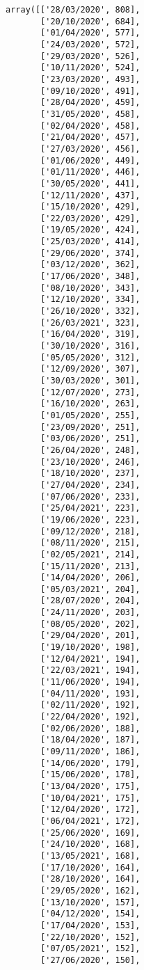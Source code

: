 \documentclass[11pt]{article}
\makeatletter
\newcommand{\boxspacing}{\kern\kvtcb@left@rule\kern\kvtcb@boxsep}
\newcommand{\prompt}[4]{
        {\ttfamily\llap{{\color{#2}[#3]:\hspace{3pt}#4}}\vspace{-\baselineskip}}
    }
\makeatother
\begin{document}
            \begin{tcolorbox}[breakable, size=fbox, boxrule=.5pt, pad at break*=1mm, opacityfill=0]
\prompt{Out}{outcolor}{32}{\boxspacing}
\begin{Verbatim}[commandchars=\\\{\}]
array([['28/03/2020', 808],
       ['20/10/2020', 684],
       ['01/04/2020', 577],
       ['24/03/2020', 572],
       ['29/03/2020', 526],
       ['10/11/2020', 524],
       ['23/03/2020', 493],
       ['09/10/2020', 491],
       ['28/04/2020', 459],
       ['31/05/2020', 458],
       ['02/04/2020', 458],
       ['21/04/2020', 457],
       ['27/03/2020', 456],
       ['01/06/2020', 449],
       ['01/11/2020', 446],
       ['30/05/2020', 441],
       ['12/11/2020', 437],
       ['15/10/2020', 429],
       ['22/03/2020', 429],
       ['19/05/2020', 424],
       ['25/03/2020', 414],
       ['29/06/2020', 374],
       ['03/12/2020', 362],
       ['17/06/2020', 348],
       ['08/10/2020', 343],
       ['12/10/2020', 334],
       ['26/10/2020', 332],
       ['26/03/2021', 323],
       ['16/04/2020', 319],
       ['30/10/2020', 316],
       ['05/05/2020', 312],
       ['12/09/2020', 307],
       ['30/03/2020', 301],
       ['12/07/2020', 273],
       ['16/10/2020', 263],
       ['01/05/2020', 255],
       ['23/09/2020', 251],
       ['03/06/2020', 251],
       ['26/04/2020', 248],
       ['23/10/2020', 246],
       ['18/10/2020', 237],
       ['27/04/2020', 234],
       ['07/06/2020', 233],
       ['25/04/2021', 223],
       ['19/06/2020', 223],
       ['09/12/2020', 218],
       ['08/11/2020', 215],
       ['02/05/2021', 214],
       ['15/11/2020', 213],
       ['14/04/2020', 206],
       ['05/03/2021', 204],
       ['28/07/2020', 204],
       ['24/11/2020', 203],
       ['08/05/2020', 202],
       ['29/04/2020', 201],
       ['19/10/2020', 198],
       ['12/04/2021', 194],
       ['22/03/2021', 194],
       ['11/06/2020', 194],
       ['04/11/2020', 193],
       ['02/11/2020', 192],
       ['22/04/2020', 192],
       ['02/06/2020', 188],
       ['18/04/2020', 187],
       ['09/11/2020', 186],
       ['14/06/2020', 179],
       ['15/06/2020', 178],
       ['13/04/2020', 175],
       ['10/04/2021', 175],
       ['12/04/2020', 172],
       ['06/04/2021', 172],
       ['25/06/2020', 169],
       ['24/10/2020', 168],
       ['13/05/2021', 168],
       ['17/10/2020', 164],
       ['28/10/2020', 164],
       ['29/05/2020', 162],
       ['13/10/2020', 157],
       ['04/12/2020', 154],
       ['17/04/2020', 153],
       ['22/10/2020', 152],
       ['07/05/2021', 152],
       ['27/06/2020', 150],

\end{Verbatim}
\end{tcolorbox}
\end{document}
